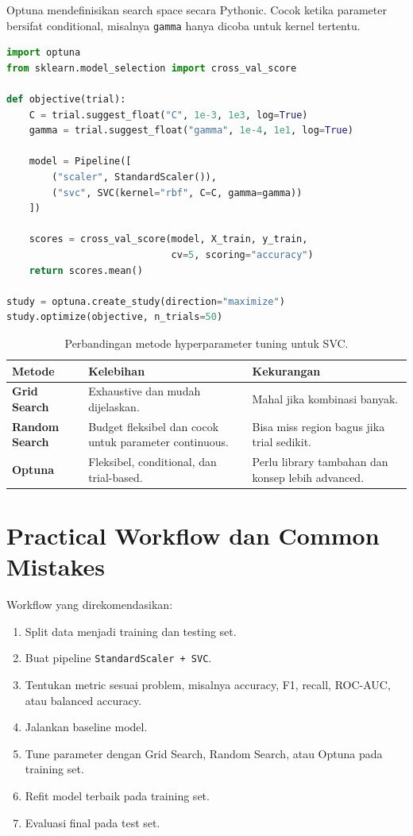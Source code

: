 \documentclass{article}
\newcommand{\code}[1]{\texttt{#1}}
\begin{document}
Optuna mendefinisikan search space secara Pythonic. Cocok ketika parameter bersifat conditional, misalnya \code{gamma} hanya dicoba untuk kernel tertentu.

\begin{lstlisting}[language=Python]
import optuna
from sklearn.model_selection import cross_val_score

def objective(trial):
    C = trial.suggest_float("C", 1e-3, 1e3, log=True)
    gamma = trial.suggest_float("gamma", 1e-4, 1e1, log=True)

    model = Pipeline([
        ("scaler", StandardScaler()),
        ("svc", SVC(kernel="rbf", C=C, gamma=gamma))
    ])

    scores = cross_val_score(model, X_train, y_train,
                             cv=5, scoring="accuracy")
    return scores.mean()

study = optuna.create_study(direction="maximize")
study.optimize(objective, n_trials=50)
\end{lstlisting}

\begin{table}[H]
\centering
{}
\begin{tabularx}{\textwidth}{>{\bfseries}lXX}
\rowcolor{tableHead}
Metode & Kelebihan & Kekurangan \\
\toprule
Grid Search & Exhaustive dan mudah dijelaskan. & Mahal jika kombinasi banyak. \\
Random Search & Budget fleksibel dan cocok untuk parameter continuous. & Bisa miss region bagus jika trial sedikit. \\
Optuna & Fleksibel, conditional, dan trial-based. & Perlu library tambahan dan konsep lebih advanced. \\
\bottomrule
\end{tabularx}
\caption{Perbandingan metode hyperparameter tuning untuk SVC.}
\end{table}

\section{Practical Workflow dan Common Mistakes}

Workflow yang direkomendasikan:

\begin{enumerate}[leftmargin=*]
    \item Split data menjadi training dan testing set.
    \item Buat pipeline \code{StandardScaler + SVC}.
    \item Tentukan metric sesuai problem, misalnya accuracy, F1, recall, ROC-AUC, atau balanced accuracy.
    \item Jalankan baseline model.
    \item Tune parameter dengan Grid Search, Random Search, atau Optuna pada training set.
    \item Refit model terbaik pada training set.
    \item Evaluasi final pada test set.
\end{enumerate}
\end{document}
